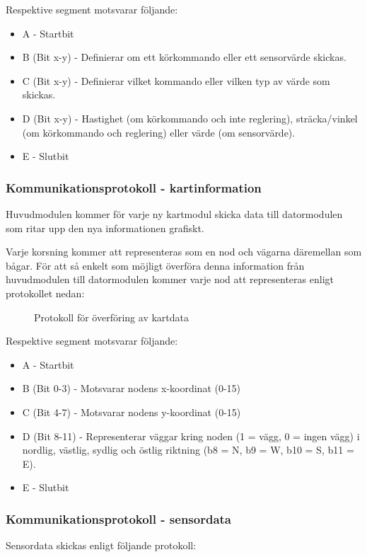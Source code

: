 \documentclass[11pt]{article}
\begin{document}
\begin{flushleft}
Respektive segment motsvarar följande: 
\begin{itemize}
	\item A - Startbit
	\item B (Bit x-y) - Definierar om ett körkommando eller ett sensorvärde skickas.
	\item C (Bit x-y) - Definierar vilket kommando eller vilken typ av värde som skickas.
	\item D (Bit x-y) - Hastighet (om körkommando och inte reglering), sträcka/vinkel (om körkommando och reglering) eller värde (om sensorvärde).
	\item E - Slutbit
\end{itemize}

\subsubsection{Kommunikationsprotokoll - kartinformation}
Huvudmodulen kommer för varje ny kartmodul skicka data till datormodulen som ritar upp den nya informationen grafiskt. 

Varje korsning kommer att representeras som en nod och vägarna däremellan som bågar. För att så enkelt som möjligt överföra denna information från huvudmodulen till datormodulen kommer varje nod att representeras enligt protokollet nedan:

 \begin{figure}[H]
\centering
\noindent\resizebox{.8\linewidth}{!}{
	}
	\caption{Protokoll för överföring av kartdata \label{kartdata}}	
\end{figure} 

Respektive segment motsvarar följande: 
\begin{itemize}
	\item A - Startbit
	\item B (Bit 0-3) - Motsvarar nodens x-koordinat (0-15)
	\item C (Bit 4-7) - Motsvarar nodens y-koordinat (0-15)
	\item D (Bit 8-11) - Representerar väggar kring noden (1 = vägg, 0 = ingen vägg) i nordlig, västlig, sydlig och östlig riktning (b8 = N, b9 = W, b10 = S, b11 = E).
	\item E - Slutbit
\end{itemize}

\subsubsection{Kommunikationsprotokoll - sensordata}
Sensordata skickas enligt följande protokoll:


\end{flushleft}
\end{document}
